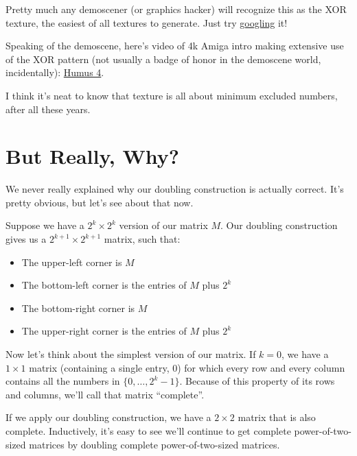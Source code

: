 \documentclass[11pt]{article}
\begin{document}
Pretty much any demoscener (or graphics hacker) will recognize this as the XOR texture, the easiest of all textures to generate. Just try \href{https://www.google.com/search?hl=en\&q=XOR+texture}{googling} it!

Speaking of the demoscene, here's video of 4k Amiga intro making extensive use of the XOR pattern (not usually a badge of honor in the demoscene world, incidentally): \href{http://www.youtube.com/watch?v=doIyjP8QbxM}{Humus 4}.

I think it's neat to know that texture is all about minimum excluded numbers, after all these years.

\section{But Really, Why?}

We never really explained why our doubling construction is actually correct. It's pretty obvious, but let's see about that now.

Suppose we have a $2^k \times 2^k$ version of our matrix $M$. Our doubling construction gives us a $2^{k+1} \times 2^{k+1}$ matrix, such that:

\begin{itemize}
\item The upper-left corner is $M$

\item The bottom-left corner is the entries of $M$ plus $2^k$

\item The bottom-right corner is $M$

\item The upper-right corner is the entries of $M$ plus $2^k$
\end{itemize}

Now let's think about the simplest version of our matrix. If $k = 0$, we have a $1 \times 1$ matrix (containing a single entry, 0) for which every row and every column contains all the numbers in $\lbrace 0, \ldots, 2^k - 1\rbrace$. Because of this property of its rows and columns, we'll call that matrix ``complete''.

If we apply our doubling construction, we have a $2 \times 2$ matrix that is also complete. Inductively, it's easy to see we'll continue to get complete power-of-two-sized matrices by doubling complete power-of-two-sized matrices.
\end{document}
